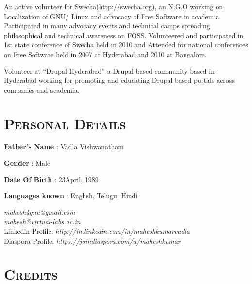 \begin{resume}
\begin{position}
An active volunteer for Swecha(http://swecha.org), an N.G.O working on
Localization of GNU/ Linux and advocacy of Free Software in
academia. Participated in many advocacy events and technical camps
spreading philosophical and technical awareness on FOSS. Volunteered
and participated in 1st state conference of Swecha held in 2010 and
Attended for national conferences on Free Software held in 2007 at
Hyderabad and 2010 at Bangalore.

\end{position}

\begin{position}
Volunteer at ``Drupal Hyderabad'' a Drupal based community based in
Hyderabad working for promoting and educating Drupal based portals
across companies and academia.\\ 
\end{position}


\section{\textsc{Personal Details}}


\textbf{Father's Name} : Vadla Vishwanatham

\textbf{Gender} : Male

\textbf{Date Of Birth} : 23\third  April, 1989

\textbf{Languages known} : English, Telugu, Hindi

\dates{}
\begin{position}
\emph{mahesh4gnu@gmail.com}\\
\emph{mahesh@virtual-labs.ac.in}\\
Linkedin Profile:\emph{ http://in.linkedin.com/in/maheshkumarvadla}\\
Diaspora Profile:\emph{ https://joindiaspora.com/u/maheshkumar}
\end{position}

\dates{}

\section{\textsc{Credits}}

\begin{formatb}
  \\
  \body\\
\end{formatb}


\end{resume}
